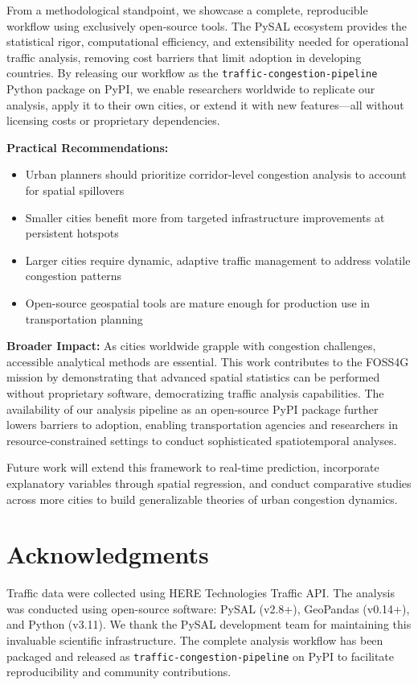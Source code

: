 \documentclass[11pt,a4paper]{article}
\begin{document}
From a methodological standpoint, we showcase a complete, reproducible workflow using exclusively open-source tools. The PySAL ecosystem provides the statistical rigor, computational efficiency, and extensibility needed for operational traffic analysis, removing cost barriers that limit adoption in developing countries. By releasing our workflow as the \texttt{traffic-congestion-pipeline} Python package on PyPI, we enable researchers worldwide to replicate our analysis, apply it to their own cities, or extend it with new features---all without licensing costs or proprietary dependencies.

\textbf{Practical Recommendations:}
\begin{itemize}
    \item Urban planners should prioritize corridor-level congestion analysis to account for spatial spillovers
    \item Smaller cities benefit more from targeted infrastructure improvements at persistent hotspots
    \item Larger cities require dynamic, adaptive traffic management to address volatile congestion patterns
    \item Open-source geospatial tools are mature enough for production use in transportation planning
\end{itemize}

\textbf{Broader Impact:} As cities worldwide grapple with congestion challenges, accessible analytical methods are essential. This work contributes to the FOSS4G mission by demonstrating that advanced spatial statistics can be performed without proprietary software, democratizing traffic analysis capabilities. The availability of our analysis pipeline as an open-source PyPI package further lowers barriers to adoption, enabling transportation agencies and researchers in resource-constrained settings to conduct sophisticated spatiotemporal analyses.

Future work will extend this framework to real-time prediction, incorporate explanatory variables through spatial regression, and conduct comparative studies across more cities to build generalizable theories of urban congestion dynamics.

\section*{Acknowledgments}

Traffic data were collected using HERE Technologies Traffic API. The analysis was conducted using open-source software: PySAL (v2.8+), GeoPandas (v0.14+), and Python (v3.11). We thank the PySAL development team for maintaining this invaluable scientific infrastructure. The complete analysis workflow has been packaged and released as \texttt{traffic-congestion-pipeline} on PyPI to facilitate reproducibility and community contributions.
\end{document}

